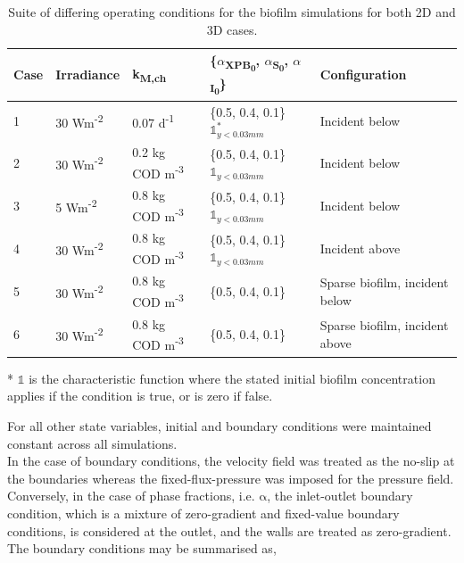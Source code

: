 \begin{table}[H]
    \centering
    \small
    \renewcommand{\arraystretch}{1.4}
    \caption{Suite of differing operating conditions for the biofilm simulations for both 2D and 3D cases.}
    \tabcolsep=0.11cm
    \begin{tabular}{@{}p{1cm} p{2cm} p{3cm} p{5cm} p{5cm}@{}} \toprule
Case & Irradiance  & k\textsubscript{M,ch}  & \{$\alpha$\textsubscript{XPB\textsubscript{0}}, $\alpha$\textsubscript{S\textsubscript{0}}, $\alpha$\textsubscript{I\textsubscript{0}}\}  &  Configuration \\ \hline
1    &  30 Wm\textsuperscript{-2}  &    0.07 d\textsuperscript{-1}    &  \{0.5, 0.4, 0.1\}$\mathds{1}^*_{y<0.03mm}$  & Incident below\\
2     &  30 Wm\textsuperscript{-2}  &    0.2 kg COD m\textsuperscript{-3}    &  \{0.5, 0.4, 0.1\}$\mathds{1}_{y<0.03mm}$ & Incident below\\
3    &  5 Wm\textsuperscript{-2}  &    0.8 kg COD m\textsuperscript{-3}    &  \{0.5, 0.4, 0.1\}$\mathds{1}_{y<0.03mm}$  & Incident below\\
4    &  30 Wm\textsuperscript{-2}  &    0.8 kg COD m\textsuperscript{-3}    &  \{0.5, 0.4, 0.1\}$\mathds{1}_{y<0.03mm}$  & Incident above\\
5    &  30 Wm\textsuperscript{-2}  &    0.8 kg COD m\textsuperscript{-3}    &  \{0.5, 0.4, 0.1\}  & Sparse biofilm, incident below\\
6    &  30 Wm\textsuperscript{-2}  &    0.8 kg COD m\textsuperscript{-3}    &  \{0.5, 0.4, 0.1\}  & Sparse biofilm, incident above\\ \hline
    \end{tabular}
  \scriptsize{
     * $\mathds{1}$ is the characteristic function where the stated initial biofilm concentration applies if the condition is true, or is zero if false.} 
    \label{tab:biofilm_cases}
\end{table}

For all other state variables, initial and boundary conditions were maintained constant across all simulations.\\

In the case of boundary conditions, the velocity field was treated as the no-slip at the boundaries whereas the fixed-flux-pressure was imposed for the pressure field. Conversely, in the case of phase fractions, i.e. $\mathrm{\alpha}$, the inlet-outlet boundary condition, which is a mixture of zero-gradient and fixed-value boundary conditions, is considered at the outlet, and the walls are treated as zero-gradient. The boundary conditions may be summarised as,  


